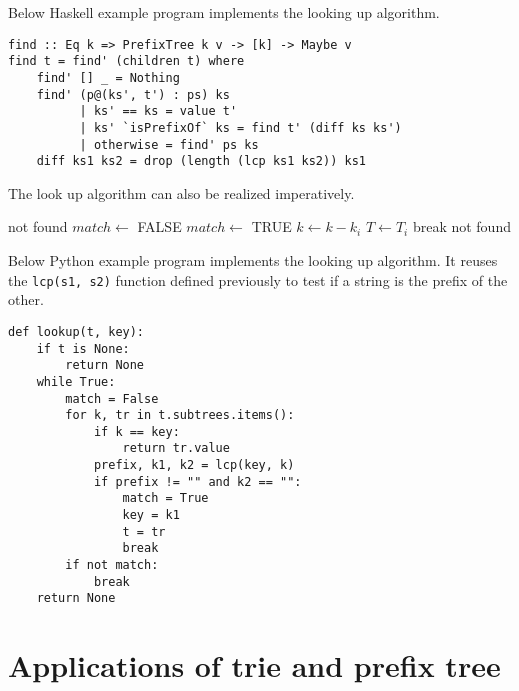 \documentclass[b5paper]{article}
\begin{document}
Below Haskell example program implements the looking up algorithm.

\lstset{language=Haskell}
\begin{lstlisting}
find :: Eq k => PrefixTree k v -> [k] -> Maybe v
find t = find' (children t) where
    find' [] _ = Nothing
    find' (p@(ks', t') : ps) ks
          | ks' == ks = value t'
          | ks' `isPrefixOf` ks = find t' (diff ks ks')
          | otherwise = find' ps ks
    diff ks1 ks2 = drop (length (lcp ks1 ks2)) ks1
\end{lstlisting}

The look up algorithm can also be realized imperatively.

\begin{algorithmic}[1]
     \State \Return not found
   \EndIf
  \Repeat
    \State $match \gets$ FALSE
        \State \Return {}
      \EndIf
        \State $match \gets$ TRUE
        \State $k \gets k - k_i$
        \State $T \gets T_i$
        \State break
      \EndIf
    \EndFor
  \State \Return not found
\EndFunction
\end{algorithmic}

Below Python example program implements the looking up algorithm.
It reuses the \texttt{lcp(s1, s2)} function
defined previously to test if a string is the prefix of the other.

\lstset{language=Python}
\begin{lstlisting}
def lookup(t, key):
    if t is None:
        return None
    while True:
        match = False
        for k, tr in t.subtrees.items():
            if k == key:
                return tr.value
            prefix, k1, k2 = lcp(key, k)
            if prefix != "" and k2 == "":
                match = True
                key = k1
                t = tr
                break
        if not match:
            break
    return None
\end{lstlisting}


\section{Applications of trie and prefix tree}
\end{document}
